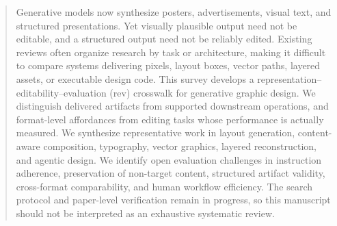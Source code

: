 \begin{abstract}
Generative models now synthesize posters, advertisements, visual text, and structured presentations.
Yet visually plausible output need not be editable, and a structured output need not be reliably edited.
Existing reviews often organize research by task or architecture, making it difficult to compare systems delivering pixels, layout boxes, vector paths, layered assets, or executable design code.
This survey develops a representation--editability--evaluation (\ac{rev}) crosswalk for generative graphic design.
We distinguish delivered artifacts from supported downstream operations, and format-level affordances from editing tasks whose performance is actually measured.
We synthesize representative work in layout generation, content-aware composition, typography, vector graphics, layered reconstruction, and agentic design.
We identify open evaluation challenges in instruction adherence, preservation of non-target content, structured artifact validity, cross-format comparability, and human workflow efficiency.
The search protocol and paper-level verification remain in progress, so this manuscript should not be interpreted as an exhaustive systematic review.
\end{abstract}
